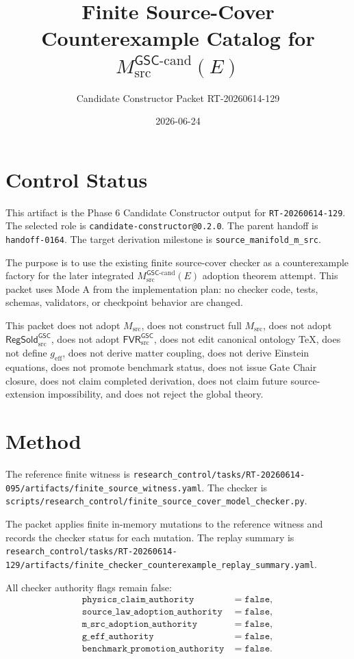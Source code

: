 \documentclass[11pt]{article}
\title{Finite Source-Cover Counterexample Catalog for \(M_{\mathrm{src}}^{\mathsf{GSC}\mbox{-}\mathrm{cand}}(E)\)}
\author{Candidate Constructor Packet RT-20260614-129}
\date{2026-06-24}
\newcommand{\GSC}{\mathsf{GSC}}
\newcommand{\Msrc}{M_{\mathrm{src}}}
\newcommand{\Mgsccand}{M_{\mathrm{src}}^{\GSC\mbox{-}\mathrm{cand}}}
\newcommand{\geff}{g_{\mathrm{eff}}}
\begin{document}
\maketitle

\section{Control Status}

This artifact is the Phase 6 Candidate Constructor output for
\texttt{RT-20260614-129}. The selected role is
\texttt{candidate-constructor@0.2.0}. The parent handoff is
\texttt{handoff-0164}. The target derivation milestone is
\texttt{source\_manifold\_m\_src}.

The purpose is to use the existing finite source-cover checker as a
counterexample factory for the later integrated \(\Mgsccand(E)\) adoption
theorem attempt. This packet uses Mode A from the implementation plan: no
checker code, tests, schemas, validators, or checkpoint behavior are changed.

This packet does not adopt \(\Msrc\), does not construct full \(\Msrc\), does
not adopt \(\mathsf{RegSold}_{\mathrm{src}}^{\GSC}\), does not adopt
\(\mathsf{FVR}_{\mathrm{src}}^{\GSC}\), does not edit canonical ontology TeX,
does not define \(\geff\), does not derive matter coupling, does not derive
Einstein equations, does not promote benchmark status, does not issue Gate
Chair closure, does not claim completed derivation, does not claim future
source-extension impossibility, and does not reject the global theory.

\section{Method}

The reference finite witness is
\texttt{research\_control/tasks/RT-20260614-095/artifacts/finite\_source\_witness.yaml}.
The checker is
\texttt{scripts/research\_control/finite\_source\_cover\_model\_checker.py}.

The packet applies finite in-memory mutations to the reference witness and
records the checker status for each mutation. The replay summary is
\texttt{research\_control/tasks/RT-20260614-129/artifacts/finite\_checker\_counterexample\_replay\_summary.yaml}.

All checker authority flags remain false:
\[
\begin{array}{ll}
\texttt{physics\_claim\_authority} &= \texttt{false},\\
\texttt{source\_law\_adoption\_authority} &= \texttt{false},\\
\texttt{m\_src\_adoption\_authority} &= \texttt{false},\\
\texttt{g\_eff\_authority} &= \texttt{false},\\
\texttt{benchmark\_promotion\_authority} &= \texttt{false}.
\end{array}
\]
\end{document}
